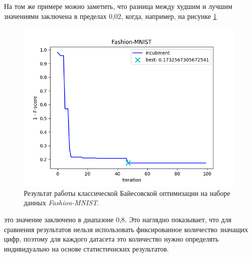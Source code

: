 \documentclass[times,specification,annotation]{itmo-student-thesis}
\begin{document}
	На том же примере можно заметить, что разница между худшим и лучшим значениями заключена в пределах 0,02, когда, например, на рисунке \ref{img:bo-fashion} 
	\begin{figure}[!ht]
		\caption{Результат работы классической Байесовской оптимизации на наборе данных \textit{Fashion-MNIST}.}\label{img:bo-fashion}
		\includegraphics[width=0.85\linewidth]{../png/incubment-iteration/Fashion-MNIST}
		\centering
	\end{figure}
	это значение заключено в диапазоне 0,8. Это наглядно показывает, что для сравнения результатов нельзя использовать фиксированное количество значащих цифр, поэтому для каждого датасета это количество нужно определять индивидуально на основе статистичиских результатов. 
	
\end{document}
